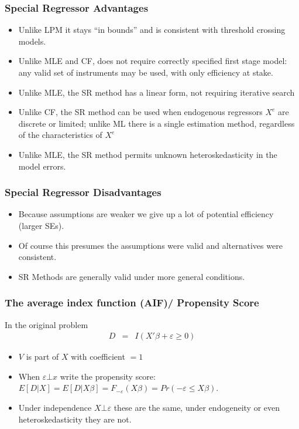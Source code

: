 \begin{frame}
\frametitle{Special Regressor Advantages}
\begin{itemize}
\item Unlike LPM it stays ``in bounds'' and is consistent with threshold crossing models.
\item Unlike MLE and CF, does not require correctly specified first stage model: any valid set of instruments may be used, with only efficiency at stake.
\item Unlike MLE, the SR method has a linear form, not requiring iterative search
\item Unlike CF, the SR method can be used when endogenous regressors $X^e$ are discrete or limited; unlike ML there is a single estimation method, regardless of the characteristics of $X^e$
\item Unlike MLE, the SR method permits unknown heteroskedasticity in the model errors.
\end{itemize}
\end{frame}

\begin{frame}
\frametitle{Special Regressor Disadvantages}
\begin{itemize}
\item Because assumptions are weaker we give up a lot of potential efficiency (larger SEs).
\item Of course this presumes the assumptions were valid and alternatives were consistent.
\item SR Methods are generally valid under more general conditions.
\end{itemize}
\end{frame}

\begin{frame}
\frametitle{ The average index function (AIF)/ Propensity Score}
In the original problem
\begin{eqnarray*}
D &=& I ( X' \beta + \varepsilon \geq 0 )
\end{eqnarray*}
\begin{itemize}
\item $V$ is part of $X$ with coefficient $=1$
\item When $\varepsilon \bot x$ write the propensity score: $E[D | X] = E[D | X \beta] = F_{-\varepsilon} (X \beta)  = Pr(- \varepsilon \leq X \beta)$. 
\item Under independence $X \bot \varepsilon$ these are the same, under endogeneity or even heteroskedasticity they are not.
\end{itemize}
\end{frame}

